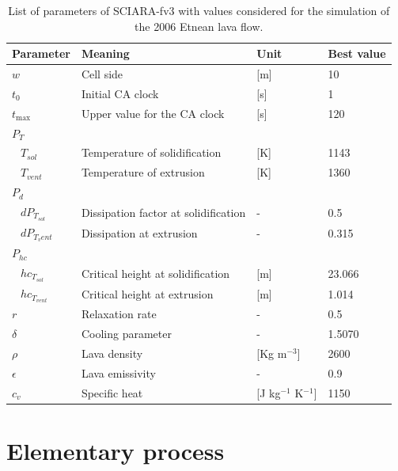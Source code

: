 \begin{table}[!t]
\renewcommand{\arraystretch}{1.3}
\caption{List of parameters of SCIARA-fv3 with values considered for the simulation of the 2006 Etnean lava flow.}
\label{tab:parameters}
\centering
\begin{tabular}{l l l l}
\hline
Parameter & Meaning & Unit & Best value\\
\hline
$w$ & Cell side & [m] & 10\\
$t_0$ & Initial CA clock & [s] & 1\\
$t_{\max}$ & Upper value for the CA clock & [s] & 120\\
$P_T$\\
	$\;\;\: T_{sol}$ & Temperature of solidification & [K] & 1143\\
	$\;\;\: T_{vent}$ & Temperature of extrusion & [K] & 1360\\
$P_d$\\
	$\;\;\: dP_{T_{sol}}$ & Dissipation factor at solidification & - & 0.5\\
	$\;\;\: dP_{{T_vent}}$ & Dissipation at extrusion & - & 0.315\\
$P_{hc}$\\
	$\;\;\: hc_{T_{sol}}$ & Critical height at solidification & [m] & 23.066\\
	$\;\;\: hc_{{T_{vent}}}$ & Critical height at extrusion & [m] & 1.014\\
$r$ & Relaxation rate & - & 0.5\\
$\delta$ & Cooling parameter & - & 1.5070\\
$\rho$ & Lava density & [Kg m$^{-3}$] & 2600\\
$\epsilon$ & Lava emissivity & - & 0.9\\
$c_v$ & Specific heat & [J kg$^{-1}$ K$^{-1}$] & 1150\\
\hline
\end{tabular}
\end{table}

\section{Elementary process}\label{sect:ElementaryProcesses}

